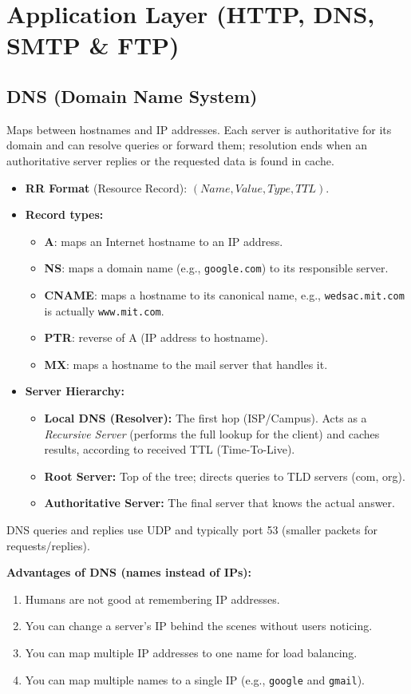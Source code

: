 \section{Application Layer (HTTP, DNS, SMTP \& FTP)}

\subsection{DNS (Domain Name System)}
Maps between hostnames and IP addresses. Each server is authoritative for its domain and can resolve queries or forward them; resolution ends when an authoritative server replies or the requested data is found in cache.
\begin{itemize}
    \item \textbf{RR Format} (Resource Record): $(Name, Value, Type, TTL)$.
    \item \textbf{Record types:}
    \begin{itemize}
		\item \textbf{A}: maps an Internet hostname to an IP address.
		\item \textbf{NS}: maps a domain name (e.g., \texttt{google.com}) to its responsible server.
		\item \textbf{CNAME}: maps a hostname to its canonical name, e.g., \texttt{wedsac.mit.com} is actually \texttt{www.mit.com}.
		\item \textbf{PTR}: reverse of A (IP address to hostname).
		\item \textbf{MX}: maps a hostname to the mail server that handles it.
	\end{itemize}
	\item \textbf{Server Hierarchy:}
    \begin{itemize}
        \item \textbf{Local DNS (Resolver):} The first hop (ISP/Campus). Acts as a \textit{Recursive Server} (performs the full lookup for the client) and caches results, according to received TTL (Time-To-Live).
        \item \textbf{Root Server:} Top of the tree; directs queries to TLD servers (com, org).
        \item \textbf{Authoritative Server:} The final server that knows the actual answer.
    \end{itemize}
\end{itemize}
DNS queries and replies use UDP and typically port 53 (smaller packets for requests/replies).

\textbf{Advantages of DNS (names instead of IPs):}
\begin{enumerate}
	\item Humans are not good at remembering IP addresses.
	\item You can change a server's IP behind the scenes without users noticing.
	\item You can map multiple IP addresses to one name for load balancing.
	\item You can map multiple names to a single IP (e.g., \texttt{google} and \texttt{gmail}).
\end{enumerate}


